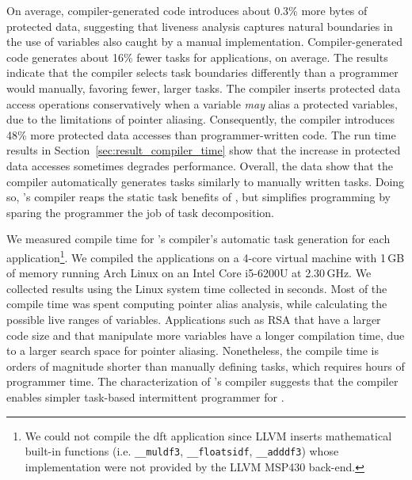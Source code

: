 On average, compiler-generated code introduces about 0.3\% more bytes of
protected data, suggesting that liveness analysis captures natural boundaries
in the use of variables also caught by a manual implementation.
Compiler-generated code generates about 16\% fewer tasks for applications, on
average.  The results indicate that the \sys compiler selects task boundaries
differently than a programmer would manually, favoring fewer, larger tasks.
The \sys compiler inserts protected data access operations conservatively when
a variable {\em may} alias a protected variables, due to the limitations of
pointer aliasing. Consequently, the \sys compiler introduces 48\% more
protected data accesses than programmer-written code. The run time results in
Section~\ref{sec:result_compiler_time} show that the increase in protected data
accesses sometimes degrades performance. Overall, the data show that the
compiler automatically generates tasks similarly to manually written tasks.
Doing so, \sys's compiler reaps the static task benefits of \sys, but
simplifies programming by sparing the programmer the job of task decomposition. 

We measured compile time for \sys's compiler's automatic task generation for
each application\footnote{We could not compile the dft application since LLVM
inserts mathematical built-in functions (i.e. \texttt{\_\_muldf3},
\texttt{\_\_floatsidf}, \texttt{\_\_adddf3}) whose implementation were not
provided by the LLVM MSP430 back-end.}. We compiled the applications on a
4-core virtual machine with 1\,GB of memory running Arch Linux on an Intel Core
i5-6200U at 2.30\,GHz. We collected results using the Linux system time
collected in seconds. Most of the compile time was spent computing pointer
alias analysis, while calculating the possible live ranges of variables.
Applications such as RSA that have a larger code size and that manipulate more
variables have a longer compilation time, due to a larger search space for
pointer aliasing. Nonetheless, the compile time is orders of magnitude shorter
than manually defining tasks, which requires hours of programmer time. The
characterization of \sys's compiler suggests that the \sys compiler enables
simpler task-based intermittent programmer for \sys.


